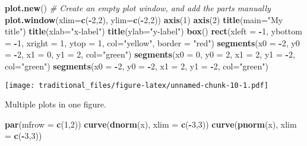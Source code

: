 \documentclass[]{article}
\newenvironment{Shaded}{\begin{snugshade}}{\end{snugshade}}
\newcommand{\KeywordTok}[1]{\textcolor[rgb]{0.13,0.29,0.53}{\textbf{#1}}}
\newcommand{\DataTypeTok}[1]{\textcolor[rgb]{0.13,0.29,0.53}{#1}}
\newcommand{\DecValTok}[1]{\textcolor[rgb]{0.00,0.00,0.81}{#1}}
\newcommand{\StringTok}[1]{\textcolor[rgb]{0.31,0.60,0.02}{#1}}
\newcommand{\CommentTok}[1]{\textcolor[rgb]{0.56,0.35,0.01}{\textit{#1}}}
\newcommand{\OperatorTok}[1]{\textcolor[rgb]{0.81,0.36,0.00}{\textbf{#1}}}
\newcommand{\NormalTok}[1]{#1}
\begin{document}
\begin{Shaded}
\begin{Highlighting}[]
\KeywordTok{plot.new}\NormalTok{()  }\CommentTok{# Create an empty plot window, and add the parts manually}
\KeywordTok{plot.window}\NormalTok{(}\DataTypeTok{xlim=}\KeywordTok{c}\NormalTok{(}\OperatorTok{-}\DecValTok{2}\NormalTok{,}\DecValTok{2}\NormalTok{), }\DataTypeTok{ylim=}\KeywordTok{c}\NormalTok{(}\OperatorTok{-}\DecValTok{2}\NormalTok{,}\DecValTok{2}\NormalTok{))}
\KeywordTok{axis}\NormalTok{(}\DecValTok{1}\NormalTok{)}
\KeywordTok{axis}\NormalTok{(}\DecValTok{2}\NormalTok{)}
\KeywordTok{title}\NormalTok{(}\DataTypeTok{main=}\StringTok{"My title"}\NormalTok{)}
\KeywordTok{title}\NormalTok{(}\DataTypeTok{xlab=}\StringTok{"x-label"}\NormalTok{)}
\KeywordTok{title}\NormalTok{(}\DataTypeTok{ylab=}\StringTok{"y-label"}\NormalTok{)}
\KeywordTok{box}\NormalTok{()}
\KeywordTok{rect}\NormalTok{(}\DataTypeTok{xleft =} \OperatorTok{-}\DecValTok{1}\NormalTok{, }\DataTypeTok{ybottom =} \OperatorTok{-}\DecValTok{1}\NormalTok{, }\DataTypeTok{xright =} \DecValTok{1}\NormalTok{, }\DataTypeTok{ytop =} \DecValTok{1}\NormalTok{, }\DataTypeTok{col=}\StringTok{"yellow"}\NormalTok{, }\DataTypeTok{border =} \StringTok{"red"}\NormalTok{)}
\KeywordTok{segments}\NormalTok{(}\DataTypeTok{x0 =} \OperatorTok{-}\DecValTok{2}\NormalTok{, }\DataTypeTok{y0 =} \OperatorTok{-}\DecValTok{2}\NormalTok{, }\DataTypeTok{x1 =} \DecValTok{0}\NormalTok{, }\DataTypeTok{y1 =} \DecValTok{2}\NormalTok{, }\DataTypeTok{col=}\StringTok{"green"}\NormalTok{)}
\KeywordTok{segments}\NormalTok{(}\DataTypeTok{x0 =} \DecValTok{0}\NormalTok{, }\DataTypeTok{y0 =} \DecValTok{2}\NormalTok{, }\DataTypeTok{x1 =} \DecValTok{2}\NormalTok{, }\DataTypeTok{y1 =} \OperatorTok{-}\DecValTok{2}\NormalTok{, }\DataTypeTok{col=}\StringTok{"green"}\NormalTok{)}
\KeywordTok{segments}\NormalTok{(}\DataTypeTok{x0 =} \OperatorTok{-}\DecValTok{2}\NormalTok{, }\DataTypeTok{y0 =} \OperatorTok{-}\DecValTok{2}\NormalTok{, }\DataTypeTok{x1 =} \DecValTok{2}\NormalTok{, }\DataTypeTok{y1 =} \OperatorTok{-}\DecValTok{2}\NormalTok{, }\DataTypeTok{col=}\StringTok{"green"}\NormalTok{)}
\end{Highlighting}
\end{Shaded}

\texttt{[image: traditional\_files/figure-latex/unnamed-chunk-10-1.pdf]}

Multiple plots in one figure.

\begin{Shaded}
\begin{Highlighting}[]
\KeywordTok{par}\NormalTok{(}\DataTypeTok{mfrow =} \KeywordTok{c}\NormalTok{(}\DecValTok{1}\NormalTok{,}\DecValTok{2}\NormalTok{))}
\KeywordTok{curve}\NormalTok{(}\KeywordTok{dnorm}\NormalTok{(x), }\DataTypeTok{xlim =} \KeywordTok{c}\NormalTok{(}\OperatorTok{-}\DecValTok{3}\NormalTok{,}\DecValTok{3}\NormalTok{))}
\KeywordTok{curve}\NormalTok{(}\KeywordTok{pnorm}\NormalTok{(x), }\DataTypeTok{xlim =} \KeywordTok{c}\NormalTok{(}\OperatorTok{-}\DecValTok{3}\NormalTok{,}\DecValTok{3}\NormalTok{))}
\end{Highlighting}
\end{Shaded}
\end{document}
